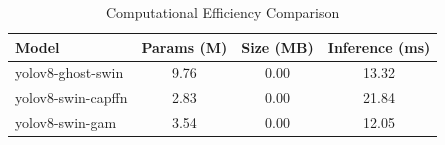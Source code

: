 
\begin{table}[htbp]
\centering
\caption{Computational Efficiency Comparison}
\label{tab:efficiency}
\begin{tabular}{lccc}
\toprule
\textbf{Model} & \textbf{Params (M)} & \textbf{Size (MB)} & \textbf{Inference (ms)} \\
\midrule
yolov8-ghost-swin & 9.76 & 0.00 & 13.32 \\
yolov8-swin-capffn & 2.83 & 0.00 & 21.84 \\
yolov8-swin-gam & 3.54 & 0.00 & 12.05 \\

\bottomrule
\end{tabular}
\end{table}
